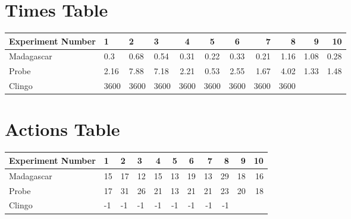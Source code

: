 \documentclass[8pt]{article}
\begin{document}
\begin{landscape}
\section{Times Table}\begin{tabular}{ | l | l | l | l | c | c | c | r | r | r | r | }\hline
Experiment Number & 1 & 2 & 3 & 4 & 5 & 6 & 7 & 8 & 9 & 10\\  \hline
Madagascar & 0.3 & 0.68 & 0.54 & 0.31 & 0.22 & 0.33 & 0.21 & 1.16 & 1.08 & 0.28\\  \hline
Probe & 2.16 & 7.88 & 7.18 & 2.21 & 0.53 & 2.55 & 1.67 & 4.02 & 1.33 & 1.48\\  \hline
Clingo & 3600 & 3600 & 3600 & 3600 & 3600 & 3600 & 3600 & 3600\\  \hline
\end{tabular}
\section{Actions Table}\begin{tabular}{ | l | l | l | l | c | c | c | r | r | r | r | }\hline
Experiment Number & 1 & 2 & 3 & 4 & 5 & 6 & 7 & 8 & 9 & 10\\ \hline
 Madagascar & 15 & 17 & 12 & 15 & 13 & 19 & 13 & 29 & 18 & 16\\ \hline
 Probe & 17 & 31 & 26 & 21 & 13 & 21 & 21 & 23 & 20 & 18\\ \hline
 Clingo & -1 & -1 & -1 & -1 & -1 & -1 & -1 & -1\\ \hline
\end{tabular}
\end{landscape}
\end{document}
